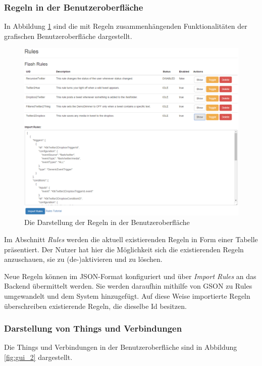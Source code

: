 \subsubsection{Regeln in der Benutzeroberfläche}
In Abbildung \ref{fig:gui_1} sind die mit Regeln zusammenhängenden Funktionalitäten der grafischen Benutzeroberfläche dargestellt.\\

\begin{figure}
	\centering
	\includegraphics[angle=90, width=\textwidth]{bilder/gui_all4_1}
	\caption{Die Darstellung der Regeln in der Benutzeroberfläche}
	\label{fig:gui_1}
\end{figure}

Im Abschnitt \textit{Rules} werden die aktuell existierenden Regeln in Form einer Tabelle präsentiert. Der Nutzer hat hier die Möglichkeit sich die existierenden Regeln anzuschauen, sie zu (de-)aktivieren und zu löschen. 

Neue Regeln können im JSON-Format konfiguriert und über \textit{Import Rules} an das Backend übermittelt werden. Sie werden daraufhin mithilfe von GSON\cite{gson} zu Rules umgewandelt und dem System hinzugefügt. Auf diese Weise importierte Regeln überschreiben existierende Regeln, die dieselbe Id besitzen.






\subsubsection{Darstellung von Things und Verbindungen}
\label{thing_table}
Die Things und Verbindungen in der Benutzeroberfläche sind in Abbildung \ref{fig:gui_2} dargestellt.\\

